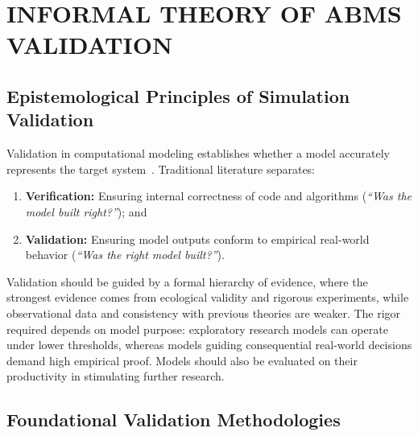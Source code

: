 \documentclass[12pt,a4paper]{report}
\begin{document}

\chapter{INFORMAL THEORY OF ABMS VALIDATION}
\label{chap:abm_validation}

\section{Epistemological Principles of Simulation Validation}
\label{sec:validation_principles}

Validation in computational modeling establishes whether a model accurately represents the target system~\cite{grimm2006standard}. Traditional literature separates:
\begin{enumerate}[label=\arabic*.]
    \item \textbf{Verification:} Ensuring internal correctness of code and algorithms (\textit{``Was the model built right?''}); and
    \item \textbf{Validation:} Ensuring model outputs conform to empirical real-world behavior (\textit{``Was the right model built?''}).
\end{enumerate}

Validation should be guided by a formal hierarchy of evidence, where the strongest evidence comes from ecological validity and rigorous experiments, while observational data and consistency with previous theories are weaker. The rigor required depends on model purpose: exploratory research models can operate under lower thresholds, whereas models guiding consequential real-world decisions demand high empirical proof. Models should also be evaluated on their productivity in stimulating further research.

\section{Foundational Validation Methodologies}
\label{sec:foundational_val}
\end{document}
